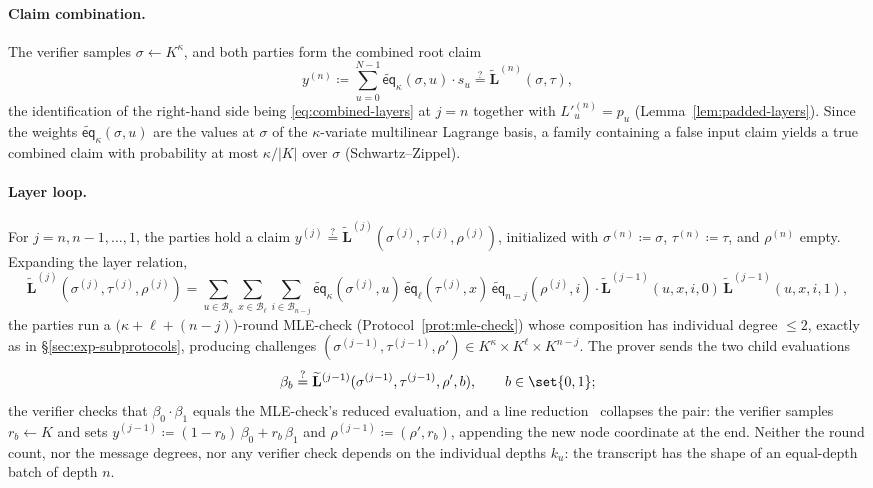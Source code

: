 \documentclass{article}
\theoremstyle{definition}
\newcommand*{\mle}{\widetilde}
\newcommand{\eq}{\mathsf{eq}}
\newcommand{\BB}{\mathcal{B}}
\begin{document}
\paragraph{Claim combination.}
The verifier samples $\sigma \gets K^\kappa$, and both parties form the combined root claim
\[
  y^{(n)} \coloneqq \sum_{u = 0}^{N - 1} \mle{\eq}_\kappa(\sigma, u) \cdot s_u \stackrel{?}{=} \mle{\mathbf{L}}^{(n)}(\sigma, \tau),
\]
the identification of the right-hand side being \eqref{eq:combined-layers} at $j = n$ together with $L'^{(n)}_u = p_u$ (Lemma~\ref{lem:padded-layers}). Since the weights $\mle{\eq}_\kappa(\sigma, u)$ are the values at $\sigma$ of the $\kappa$-variate multilinear Lagrange basis, a family containing a false input claim yields a true combined claim with probability at most $\kappa / |K|$ over $\sigma$ (Schwartz--Zippel).

\paragraph{Layer loop.}
For $j = n, n - 1, \ldots, 1$, the parties hold a claim $y^{(j)} \stackrel{?}{=} \mle{\mathbf{L}}^{(j)}(\sigma^{(j)}, \tau^{(j)}, \rho^{(j)})$, initialized with $\sigma^{(n)} \coloneqq \sigma$, $\tau^{(n)} \coloneqq \tau$, and $\rho^{(n)}$ empty. Expanding the layer relation,
\[
  \mle{\mathbf{L}}^{(j)}(\sigma^{(j)}, \tau^{(j)}, \rho^{(j)}) = \sum_{u \in \BB_\kappa} \sum_{x \in \BB_\ell} \sum_{i \in \BB_{n - j}} \mle{\eq}_\kappa(\sigma^{(j)}, u) \, \mle{\eq}_\ell(\tau^{(j)}, x) \, \mle{\eq}_{n - j}(\rho^{(j)}, i) \cdot \mle{\mathbf{L}}^{(j - 1)}(u, x, i, 0) \, \mle{\mathbf{L}}^{(j - 1)}(u, x, i, 1),
\]
the parties run a $\bigl( \kappa + \ell + (n - j) \bigr)$-round MLE-check (Protocol~\ref{prot:mle-check}) whose composition has individual degree $\leq 2$, exactly as in \S\ref{sec:exp-subprotocols}, producing challenges $(\sigma^{(j - 1)}, \tau^{(j - 1)}, \rho') \in K^\kappa \times K^\ell \times K^{n - j}$. The prover sends the two child evaluations
\[
  \beta_b \stackrel{?}{=} \mle{\mathbf{L}}^{(j - 1)}(\sigma^{(j - 1)}, \tau^{(j - 1)}, \rho', b), \qquad b \in \set{0, 1};
\]
the verifier checks that $\beta_0 \cdot \beta_1$ equals the MLE-check's reduced evaluation, and a line reduction~\cite{Goldwasser:2015aa} collapses the pair: the verifier samples $r_b \gets K$ and sets $y^{(j - 1)} \coloneqq (1 - r_b)\, \beta_0 + r_b\, \beta_1$ and $\rho^{(j - 1)} \coloneqq (\rho', r_b)$, appending the new node coordinate at the end. Neither the round count, nor the message degrees, nor any verifier check depends on the individual depths $k_u$: the transcript has the shape of an equal-depth batch of depth $n$.
\end{document}
